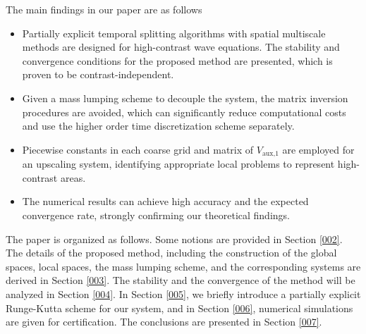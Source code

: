 \documentclass[preprint,12pt]{elsarticle}
\begin{document}
The main findings in our paper are as follows
\begin{itemize}
  \item Partially explicit temporal splitting algorithms with spatial multiscale methods are designed for high-contrast wave equations. The stability and convergence conditions for the proposed method are presented, which is proven to be contrast-independent.
  \item Given a mass lumping scheme to decouple the system, the matrix inversion procedures are avoided, which can significantly reduce computational costs and use the higher order time discretization scheme separately.
  \item Piecewise constants in each coarse grid and matrix of $V_{\text{aux,1}}$ are employed for an upscaling system, identifying appropriate local problems to represent high-contrast areas.
  \item The numerical results can achieve high accuracy and the expected convergence rate, strongly confirming our theoretical findings.
\end{itemize}
The paper is organized as follows. Some notions are provided in Section \ref{002}. The details of the proposed method, including the construction of the global spaces, local spaces, the mass lumping scheme, and the corresponding systems are derived in Section \ref{003}. The stability and the convergence of the method will be analyzed in Section \ref{004}. In Section \ref{005}, we briefly introduce a partially explicit Runge-Kutta scheme for our system, and in Section \ref{006}, numerical simulations are given for certification. The conclusions are presented in Section \ref{007}.
\end{document}
